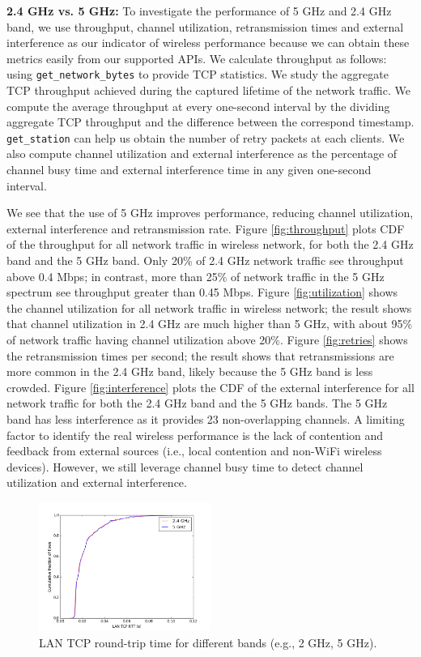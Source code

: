 \textbf{2.4 GHz vs. 5 GHz:} To investigate the performance of 5 GHz and 2.4 GHz band, we use throughput, channel utilization, retransmission times and external interference as our indicator of wireless performance because we can obtain these metrics easily from our supported APIs. We calculate throughput as follows: using \texttt{get\_network\_bytes} to provide TCP statistics. We study the aggregate TCP throughput achieved during the captured lifetime of the network traffic. We compute the average throughput at every one-second interval by the dividing aggregate TCP throughput and the difference between the correspond timestamp. \texttt{get\_station} can help us obtain the number of retry packets at each clients. We also compute channel utilization and external interference as the percentage of channel busy time and external interference time in any given one-second interval. 

We see that the use of 5 GHz improves performance, reducing channel utilization, external interference and retransmission rate. Figure \ref{fig:throughput} plots CDF of the throughput for all network traffic in wireless network, for both the 2.4 GHz band and the 5 GHz band. Only 20\% of 2.4 GHz network traffic see throughput above 0.4 Mbps; in contrast, more than 25\% of network traffic in the 5 GHz spectrum see throughput greater than 0.45 Mbps. Figure \ref{fig:utilization} shows the channel utilization for all network traffic in wireless network; the result shows that channel utilization in 2.4 GHz are much higher than 5 GHz, with about 95\% of network traffic having channel utilization above 20\%. Figure \ref{fig:retries} shows the retransmission times per second; the result shows that retransmissions are more common in the 2.4 GHz band, likely because the 5 GHz band is less crowded. Figure \ref{fig:interference} plots the CDF of the external interference for all network traffic for both the 2.4 GHz band and the 5 GHz bands. The 5 GHz band has less interference as it provides 23 non-overlapping channels. A limiting factor to identify the real wireless performance is the lack of contention and feedback from external sources (i.e., local contention and non-WiFi wireless devices). However, we still leverage channel busy time to detect channel utilization and external interference.

\begin{figure}
\centering
\includegraphics[width=0.5\textwidth]{figure/tcp_rtt.png}
\caption{LAN TCP round-trip time for different bands (e.g., 2 GHz, 5 GHz).} 
\label{fig:tcprtt}
\end{figure}

